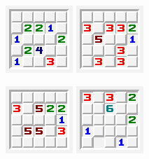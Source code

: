 \documentclass[twoside,12pt,parskip=half-]{scrartcl}
\begin{document}
\begin{multicols}{2}
\includegraphics[width=0.45\linewidth]{minepuzzle_gen18tr.png}
\includegraphics[width=0.45\linewidth]{minepuzzle_gen21tr.png}

\includegraphics[width=0.45\linewidth]{minepuzzle_gen29tr.png}
\includegraphics[width=0.45\linewidth]{minepuzzle_gen19tr.png}


\end{multicols}
\end{document}
